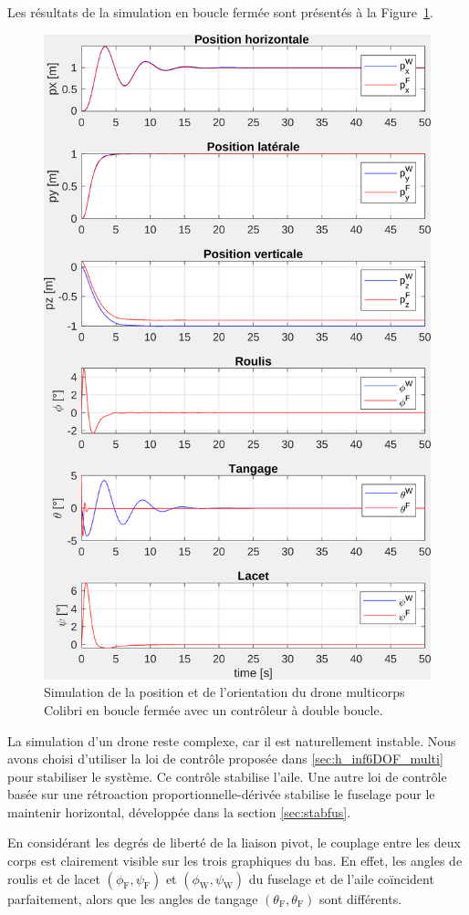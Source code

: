  Les résultats de la simulation en boucle fermée sont présentés à la Figure~\ref{fig:sim_colibri}.

\begin{figure}[ht!]
\centering
    \includegraphics[width=0.6\columnwidth,angle=0]{figures/colibri_sim.png}
    \caption{Simulation de la position et de l'orientation du drone multicorps Colibri en boucle fermée avec un contrôleur à double boucle. }
    \label{fig:sim_colibri}
\end{figure}

La simulation d'un drone reste complexe, car il est naturellement instable. Nous avons choisi d'utiliser la loi de contrôle proposée dans \ref{sec:h_inf6DOF_multi} pour stabiliser le système. Ce contrôle stabilise l'aile. Une autre loi de contrôle basée sur une rétroaction proportionnelle-dérivée stabilise le fuselage pour le maintenir horizontal, développée dans la section \ref{sec:stabfus}.

En considérant les degrés de liberté de la liaison pivot, le couplage entre les deux corps est clairement visible sur les trois graphiques du bas. En effet, les angles de roulis et de lacet $(\phi_{\text{F}}, \psi_{\text{F}})$ et $(\phi_{\text{W}}, \psi_{\text{W}})$ du fuselage et de l'aile coïncident parfaitement, alors que les angles de tangage $(\theta_{\text{F}}, \theta_{\text{F}})$ sont différents.

